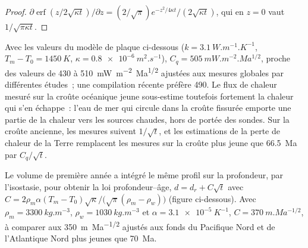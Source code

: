 \begin{proof}
$\partial\operatorname{erf}(z/2\sqrt{\kappa t})/\partial z = (2/\sqrt\pi)
e^{-z^2/4\kappa t}/(2\sqrt{\kappa t})$, qui en $z = 0$ vaut $1/\sqrt{\pi\kappa
t}$.
\end{proof}

Avec les valeurs du modèle de plaque ci-dessous ($k = \qty{3.1}{W.m^{-1}.K^{-1}}$,
$T_m - T_0 = \qty{1450}{K}$, $\kappa = \qty{0.8e-6}{m^2.s^{-1}}$), $C_q =
\qty{505}{mW.m^{-2}.Ma^{1/2}}$, proche des valeurs de 430 à
\qty{510}{mW.m^{-2}.Ma^{1/2}} ajustées aux mesures globales par différentes
études~; une compilation récente préfère \num{490}. Le flux de chaleur mesuré sur
la croûte océanique jeune sous-estime toutefois fortement la chaleur qui s'en échappe~:
l'eau de mer qui circule dans la croûte fissurée emporte une partie de la chaleur
vers les sources chaudes, hors de portée des sondes. Sur la croûte ancienne, les mesures
suivent $1/\sqrt t$, et les estimations de la perte de chaleur de la Terre remplacent les
mesures sur la croûte plus jeune que \qty{66.5}{Ma} par $C_q/\sqrt t$.

Le volume de première année a intégré le même profil sur la profondeur, par
l'isostasie, pour obtenir la loi profondeur--âge, $d = d_r + C\sqrt t$ avec $C = 2\rho_m\alpha(T_m -
T_0)\sqrt\kappa/\bigl(\sqrt\pi(\rho_m - \rho_w)\bigr)$ (figure ci-dessous). Avec
$\rho_m = \qty{3300}{kg.m^{-3}}$, $\rho_w = \qty{1030}{kg.m^{-3}}$ et $\alpha =
\qty{3.1e-5}{K^{-1}}$, $C = \qty{370}{m.Ma^{-1/2}}$, à comparer aux
\qty{350}{m.Ma^{-1/2}} ajustés aux fonds du Pacifique Nord et de l'Atlantique Nord
plus jeunes que \qty{70}{Ma}.

